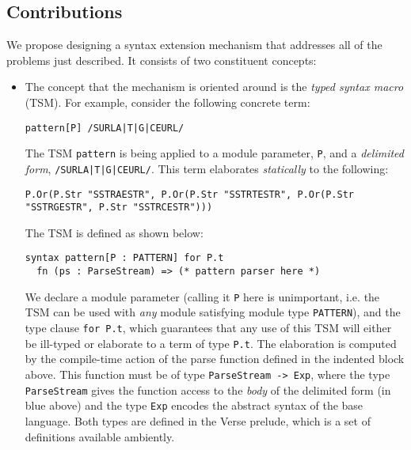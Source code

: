 \subsection{Contributions}\label{sec:syntax-contributions}
We propose designing a  syntax extension mechanism that addresses all of the problems just described. It consists of two constituent concepts:
\begin{itemize}
\item The concept that the mechanism is oriented around is the \emph{typed syntax macro} (TSM). %
For example, consider the following concrete term:
\begin{lstlisting}[numbers=none]
pattern[P] /SURLA|T|G|CEURL/
\end{lstlisting}

The TSM \lstinline{pattern} is being applied to a module parameter, \lstinline{P}, and a \emph{delimited form}, \lstinline{/SURLA|T|G|CEURL/}. This term elaborates \emph{statically} to the following:

\begin{lstlisting}[numbers=none]
P.Or(P.Str "SSTRAESTR", P.Or(P.Str "SSTRTESTR", P.Or(P.Str "SSTRGESTR", P.Str "SSTRCESTR")))
\end{lstlisting}

The TSM is defined as shown below:
\begin{lstlisting}[numbers=none]
syntax pattern[P : PATTERN] for P.t
  fn (ps : ParseStream) => (* pattern parser here *)
\end{lstlisting}
We declare a module parameter (calling it \lstinline{P} here is unimportant, i.e. the TSM can be used with \emph{any} module satisfying module type \lstinline{PATTERN}), and the type clause \lstinline{for P.t}, which guarantees that any use of this TSM will either be ill-typed or elaborate to a term of type \lstinline{P.t}. The elaboration is computed by the compile-time action of the parse function defined in the indented block above. This function must be of type \lstinline{ParseStream -> Exp}, where the type \lstinline{ParseStream} gives the function access to the \emph{body} of the delimited form (in blue above) and the type \lstinline{Exp}  encodes the abstract syntax of the base language. Both types are defined in the Verse prelude, which is a set of definitions available ambiently.


\end{itemize}
